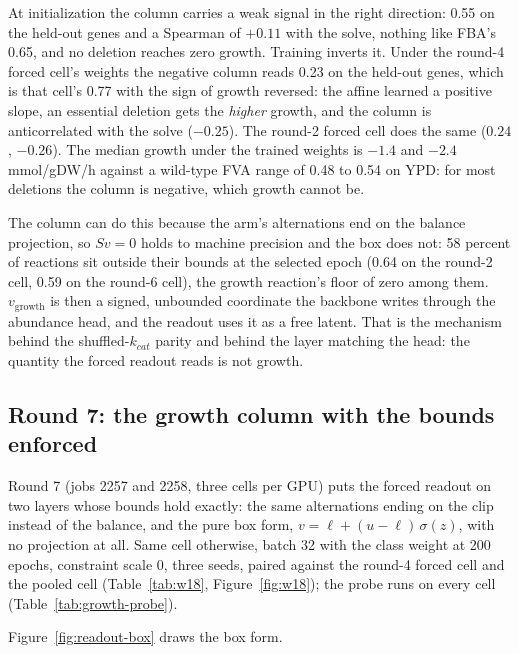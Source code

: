 

At initialization the column carries a weak signal in the right direction: 0.55 on the
held-out genes and a Spearman of $+0.11$ with the solve, nothing like FBA's 0.65, and no
deletion reaches zero growth. Training inverts it. Under the round-4 forced cell's weights
the negative column reads 0.23 on the held-out genes, which is that cell's 0.77 with the
sign of growth reversed: the affine learned a positive slope, an essential deletion gets
the \emph{higher} growth, and the column is anticorrelated with the solve ($-0.25$). The
round-2 forced cell does the same ($0.24$, $-0.26$). The median growth under the trained
weights is $-1.4$ and $-2.4$ mmol/gDW/h against a wild-type FVA range of 0.48 to 0.54 on
YPD: for most deletions the column is negative, which growth cannot be.

The column can do this because the arm's alternations end on the balance projection, so
$Sv = 0$ holds to machine precision and the box does not: 58 percent of reactions sit
outside their bounds at the selected epoch (0.64 on the round-2 cell, 0.59 on the round-6
cell), the growth reaction's floor of zero among them. $v_{\text{growth}}$ is then a
signed, unbounded coordinate the backbone writes through the abundance head, and the
readout uses it as a free latent. That is the mechanism behind the shuffled-$k_{cat}$
parity and behind the layer matching the head: the quantity the forced readout reads is
not growth.

\subsection{Round 7: the growth column with the bounds enforced}

Round 7 (jobs 2257 and 2258, three cells per GPU) puts the forced readout on two layers
whose bounds hold exactly: the same alternations ending on the clip instead of the
balance, and the pure box form, $v = \ell + (u - \ell)\,\sigma(z)$, with no projection at
all. Same cell otherwise, batch 32 with the class weight at 200 epochs, constraint scale
0, three seeds, paired against the round-4 forced cell and the pooled cell
(Table~\ref{tab:w18}, Figure~\ref{fig:w18}); the probe runs on every cell
(Table~\ref{tab:growth-probe}).

Figure~\ref{fig:readout-box} draws the box form.


